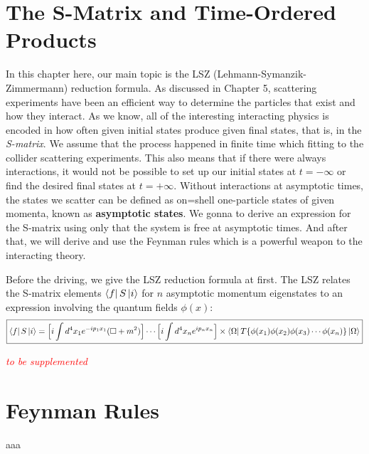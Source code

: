 \documentclass[12pt,openany]{book}
\begin{document}
	\chapter{The S-Matrix and Time-Ordered Products}
	In this chapter here, our main topic is the LSZ (Lehmann-Symanzik-Zimmermann) reduction formula. As discussed in Chapter 5, scattering experiments have been an efficient way to determine the particles that exist and how they interact.
	As we know, all of the interesting interacting physics is encoded in how often given initial states produce given final states, that is, in the \textit{S-matrix}. We assume that the process happened in 
	finite time which fitting to the collider scattering experiments. This also means that if there were always interactions, it would not be possible to set up our initial states at $t=-\infty$ or find the desired 
	final states at $t=+\infty$. Without interactions at asymptotic times, the states we scatter can be defined as on=shell one-particle states of given momenta, known as \textbf{asymptotic states}. We gonna to derive 
	an expression for the S-matrix using only that the system is free at asymptotic times. And after that, we will derive and use the Feynman rules which is a powerful weapon to the interacting theory.\par 
	Before the driving, we give the LSZ reduction formula at first. The LSZ relates the S-matrix elements $\bra{f}S\ket{i}$ for $n$ asymptotic momentum eigenstates to an expression involving the quantum fields $\phi(x)$:
	\begin{equation}
	\boxed{	\bra{f}S\ket{i}=\Big[i\int d^4x_1 e^{-ip_1x_1}(\Box+m^2)\Big]\cdots\Big[i\int d^4x_ne^{ip_nx_n}\Big]\times\bra{\Omega}T\{\phi(x_1)\phi(x_2)\phi(x_3)\cdots\phi(x_n)\}\ket{\Omega}}
	\end{equation}

	\begin{center}
		\textcolor{red}{\textit{to be supplemented}}
	\end{center}
	\chapter{Feynman Rules}
	aaa
	
	
	
	
	
	
	
	
	
	
	
	
	
	
	
	
	
	
	
	
	
	
	
	
	
	
	
	
	
	
	
	
	
	
	
	
	
	
	
	
	
	
	
	
	
	
	
	
	
	
\end{document}
